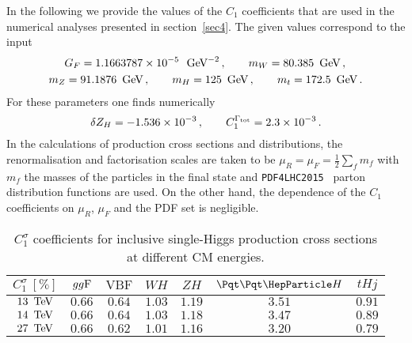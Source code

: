 In the following we provide the values of the $C_1$ coefficients that are used in the numerical analyses presented in section~\ref{sec4}. The given values correspond to the input 
\begin{equation}
\begin{split}
& \hspace{0.5cm}  G_F = 1.1663787\times  10^{-5}~{\rm ~\text{GeV}}^{-2} \,, \qquad  m_W = 80.385 \, {\rm ~\text{GeV}} \, , \\ 
& m_Z = 91.1876 \, {\rm ~\text{GeV}}\,, \qquad m_H = 125 \, {\rm ~\text{GeV}}\, , \qquad m_t = 172.5 \, {\rm ~\text{GeV}} \,.
\end{split}
\end{equation}
For these parameters one finds numerically~\cite{Degrassi:2016wml} 
\begin{equation}
\delta Z_H = -1.536\times 10^{-3} \,, \qquad C_1^{\Gamma_{\rm tot}} = 2.3 \times 10^{-3} \,.
\end{equation}
In the calculations of production cross sections and distributions, the renormalisation and factorisation scales are taken to be $ \mu_R = \mu_F = \frac{1}{2} \sum_f m_f$ with $m_f$ the masses of the particles in the final state and   {\tt PDF4LHC2015}~\cite{Butterworth:2015oua}  parton distribution functions are used. On the other hand, the dependence of the $C_1$ coefficients on $ \mu_R$,  $\mu_F$ and the PDF set is negligible.

\begin{table}[t!]
\begin{center}
\begin{tabular}{|c |c| c| c| c| c| c|}
\hline
$C_1^{\sigma}~[\%]$	& ${gg{\rm F}}$ &
${\text{VBF}} $ &  ${WH}$ & ${ZH}$ &
${\tth}$ &  ${tHj}$ \\ 
\hline \hline
$13 \, {\rm ~\text{TeV}}$ & $0.66$ & $0.64$  & $1.03$ & $1.19$ & $3.51$ & $0.91$ \\ \hline
$14 \, {\rm ~\text{TeV}}$ & $0.66$ & $0.64$  & $1.03$ & $1.18$ & $3.47$ & $0.89$ \\ \hline
$27 \, {\rm ~\text{TeV}}$ & $0.66$ & $0.62$  & $1.01$ & $1.16$ & $3.20$ & $0.79$ \\
 \hline
\end{tabular}
\end{center}
\caption{$C_1^{\sigma}$ coefficients for inclusive single-Higgs production cross sections at different CM energies.}
\label{c1s}
\end{table}
 
